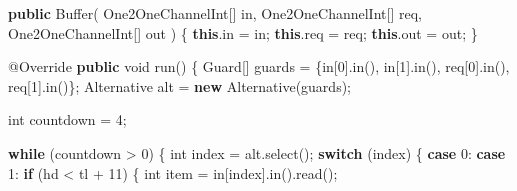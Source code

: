 \documentclass[11pt]{article}
\newenvironment{Shaded}{}{}
\newcommand{\KeywordTok}[1]{\textcolor[rgb]{0.00,0.44,0.13}{\textbf{{#1}}}}
\newcommand{\DataTypeTok}[1]{\textcolor[rgb]{0.56,0.13,0.00}{{#1}}}
\newcommand{\DecValTok}[1]{\textcolor[rgb]{0.25,0.63,0.44}{{#1}}}
\newcommand{\FunctionTok}[1]{\textcolor[rgb]{0.02,0.16,0.49}{{#1}}}
\newcommand{\NormalTok}[1]{{#1}}
\newcommand{\ControlFlowTok}[1]{\textcolor[rgb]{0.00,0.44,0.13}{\textbf{{#1}}}}
\newcommand{\OperatorTok}[1]{\textcolor[rgb]{0.40,0.40,0.40}{{#1}}}
\newcommand{\BuiltInTok}[1]{{#1}}
\newcommand{\AttributeTok}[1]{\textcolor[rgb]{0.49,0.56,0.16}{{#1}}}
\begin{document}
\begin{Shaded}
\begin{Highlighting}[]
    \KeywordTok{public} \BuiltInTok{Buffer}\OperatorTok{(}
\NormalTok{        One2OneChannelInt}\OperatorTok{[]}\NormalTok{ in}\OperatorTok{,}
\NormalTok{        One2OneChannelInt}\OperatorTok{[]}\NormalTok{ req}\OperatorTok{,}
\NormalTok{        One2OneChannelInt}\OperatorTok{[]}\NormalTok{ out}
    \OperatorTok{)} \OperatorTok{\{}
        \KeywordTok{this}\OperatorTok{.}\FunctionTok{in} \OperatorTok{=}\NormalTok{ in}\OperatorTok{;}
        \KeywordTok{this}\OperatorTok{.}\FunctionTok{req} \OperatorTok{=}\NormalTok{ req}\OperatorTok{;}
        \KeywordTok{this}\OperatorTok{.}\FunctionTok{out} \OperatorTok{=}\NormalTok{ out}\OperatorTok{;}
    \OperatorTok{\}}

    \AttributeTok{@Override}
    \KeywordTok{public} \DataTypeTok{void} \FunctionTok{run}\OperatorTok{()} \OperatorTok{\{}
        \BuiltInTok{Guard}\OperatorTok{[]}\NormalTok{ guards }\OperatorTok{=} \OperatorTok{\{}\NormalTok{in}\OperatorTok{[}\DecValTok{0}\OperatorTok{].}\FunctionTok{in}\OperatorTok{(),}\NormalTok{ in}\OperatorTok{[}\DecValTok{1}\OperatorTok{].}\FunctionTok{in}\OperatorTok{(),}\NormalTok{ req}\OperatorTok{[}\DecValTok{0}\OperatorTok{].}\FunctionTok{in}\OperatorTok{(),}\NormalTok{ req}\OperatorTok{[}\DecValTok{1}\OperatorTok{].}\FunctionTok{in}\OperatorTok{()\};}
\NormalTok{        Alternative alt }\OperatorTok{=} \KeywordTok{new} \FunctionTok{Alternative}\OperatorTok{(}\NormalTok{guards}\OperatorTok{);}

        \DataTypeTok{int}\NormalTok{ countdown }\OperatorTok{=} \DecValTok{4}\OperatorTok{;}

        \ControlFlowTok{while} \OperatorTok{(}\NormalTok{countdown }\OperatorTok{\textgreater{}} \DecValTok{0}\OperatorTok{)} \OperatorTok{\{}
            \DataTypeTok{int}\NormalTok{ index }\OperatorTok{=}\NormalTok{ alt}\OperatorTok{.}\FunctionTok{select}\OperatorTok{();}
            \ControlFlowTok{switch} \OperatorTok{(}\NormalTok{index}\OperatorTok{)} \OperatorTok{\{}
                \ControlFlowTok{case} \DecValTok{0}\OperatorTok{:}
                \ControlFlowTok{case} \DecValTok{1}\OperatorTok{:}
                    \ControlFlowTok{if} \OperatorTok{(}\NormalTok{hd }\OperatorTok{\textless{}}\NormalTok{ tl }\OperatorTok{+} \DecValTok{11}\OperatorTok{)} \OperatorTok{\{}
                        \DataTypeTok{int}\NormalTok{ item }\OperatorTok{=}\NormalTok{ in}\OperatorTok{[}\NormalTok{index}\OperatorTok{].}\FunctionTok{in}\OperatorTok{().}\FunctionTok{read}\OperatorTok{();}


\end{Highlighting}
\end{Shaded}
\end{document}
